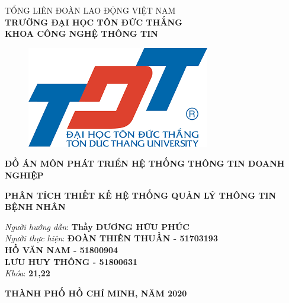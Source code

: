 \documentclass{report}
\begin{document}
\begin{center}
	\fontsize{14}{20}\selectfont
	\textsc{TỔNG LIÊN ĐOÀN LAO ĐỘNG VIỆT NAM\\ 
		\textbf{TRƯỜNG ĐẠI HỌC TÔN ĐỨC THẮNG\\} 
		\textbf{KHOA CÔNG NGHỆ THÔNG TIN}}
	
	\vspace{0.08cm}
	\begin{figure}[htp]
		\begin{center}
			\includegraphics[scale=0.15]{Hinh/logo tdt}
		\end{center}
	\end{figure}
	
	\fontsize{16}{20}\selectfont\textbf{ĐỒ ÁN MÔN PHÁT TRIỂN HỆ THỐNG THÔNG TIN DOANH NGHIỆP\\}
	
	\vspace{1.1cm}
	\fontsize{24}{20}\selectfont\textbf{PHÂN TÍCH THIẾT KẾ HỆ THỐNG QUẢN LÝ THÔNG TIN BỆNH NHÂN}
\end{center}
\vspace{2cm}
\begin{flushright}
	\fontsize{14}{20}\selectfont
	\textit{Người hướng dẫn}: \textbf{Thầy DƯƠNG HỮU PHÚC}\\
	\textit{Người thực hiện}:
	\textbf{ĐOÀN THIÊN THUẦN - 51703193}\\
	\textbf{HỒ VĂN NAM - 51800904}\\
	\textbf{LƯU HUY THÔNG - 51800631}\\
	\textit{Khóa}: \textbf{21,22}\\
\end{flushright}
\vspace{4cm}
\begin{center}
	\fontsize{14}{20}\selectfont
	\textbf{THÀNH PHỐ HỒ CHÍ MINH, NĂM 2020}
\end{center}
\pagebreak
\end{document}
